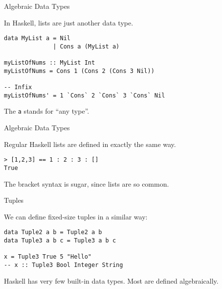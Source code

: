 %
\begin{frame}[fragile]{Algebraic Data Types}

In Haskell, lists are just another data type.

\begin{block}{}
\begin{verbatim}
data MyList a = Nil
              | Cons a (MyList a)

myListOfNums :: MyList Int
myListOfNums = Cons 1 (Cons 2 (Cons 3 Nil))

-- Infix
myListOfNums' = 1 `Cons` 2 `Cons` 3 `Cons` Nil
\end{verbatim}
\end{block}

The \texttt{a} stands for ``any type''.

\end{frame}

%
\begin{frame}[fragile]{Algebraic Data Types}

Regular Haskell lists are defined in exactly the same way.

\begin{block}{}
\begin{verbatim}
> [1,2,3] == 1 : 2 : 3 : []
True
\end{verbatim}
\end{block}

The bracket syntax is sugar, since lists are so common.

\end{frame}

%
\begin{frame}[fragile]{Tuples}

We can define fixed-size tuples in a similar way:

\begin{block}{}
\begin{verbatim}
data Tuple2 a b = Tuple2 a b
data Tuple3 a b c = Tuple3 a b c

x = Tuple3 True 5 "Hello"
-- x :: Tuple3 Bool Integer String
\end{verbatim}
\end{block}

Haskell has very few built-in data types. Most are defined algebraically.

\end{frame}
